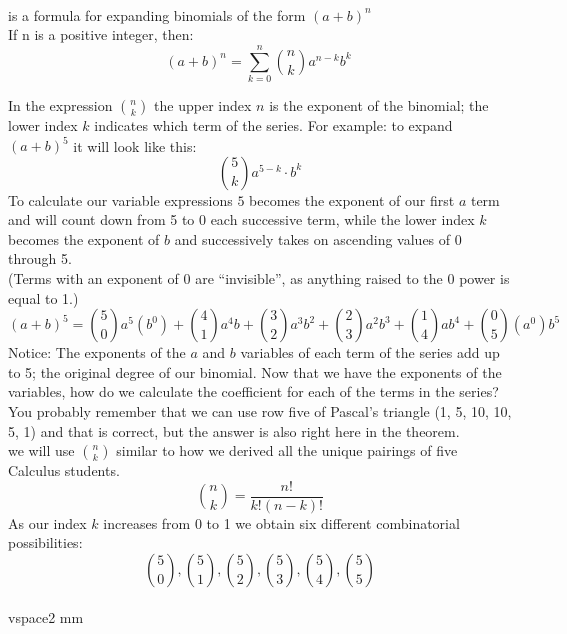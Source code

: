 \documentclass{article}
\begin{document}
 \vspace{3 mm}
 {\\
 \vspace{3mm}  {\large is a formula for expanding binomials of the form $(a+b)^n$} \\ 
 
 \large If n is a positive integer, then:\\
\[
     (a+b)^n = \sum_{k=0}^n \binom{n}{k} a^{n-k} b^{k} \
\]

\vspace{2 mm} In the expression $\binom{n}{k}$ the upper index $n$ is the exponent of the binomial; the lower index $k$ indicates which term of the series.
\vspace{2 mm}
For example: to expand  $(a + b)^5$  it will look like this:
\[
	\binom{5}{k}a^{5-k} \cdot b^k
\]
To calculate our variable expressions $5$ becomes the exponent of our first $a$ term and will count down from 5 to 0 each successive term, while the lower index $k$ becomes the exponent of $b$ and successively takes on ascending values of 0 through 5.\\
\vspace{2 mm}
(Terms with an exponent of 0 are ``invisible'',  as anything raised to the 0 power is equal to 1.)
\[
(a + b)^5 =\binom{5}{0} a^5(b^0)  +   \binom{4}{1}a^4b  +   \binom{3}{2}a^3b^2  +   \binom{2}{3}a^2b^3  +   \binom{1}{4}ab^4  +   \binom{0}{5}(a^0) b^5
\]
Notice: The exponents of the $a$ and $b$ variables of each term of the series add up to 5; the original degree of our binomial.
Now that we have the exponents of the variables, how do we calculate the coefficient for each of the terms in the series?\\
\vspace{2 mm}
 You probably remember that we can use row five of Pascal's triangle (1, 5, 10, 10, 5, 1) and that is correct, but the answer is also right here in the theorem.\\
 we will use $\binom{n}{k}$ similar to how we derived all the unique pairings of five Calculus students.
	\[
 \binom{n}{k}=\frac{n!}{k!(n-k)!}
	\]
\vspace{2 mm}As our index $k$ increases from 0 to 1 we obtain six different combinatorial possibilities: 
\[
\binom{5}{0}, \binom{5}{1}, \binom{5}{2}, \binom{5}{3}, \binom{5}{4}, \binom {5}{5}
\]
\\vspace{2 mm}

}
\end{document}

